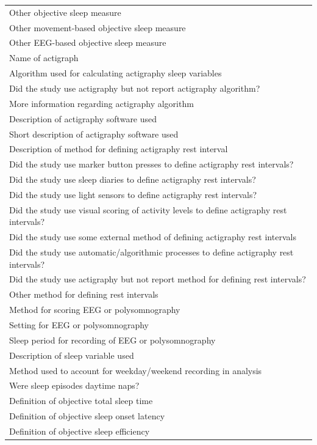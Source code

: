 \documentclass[
]{article}
\begin{document}
\begin{longtable}[t]{l}
Other objective sleep measure\\
Other movement-based objective sleep measure\\
Other EEG-based objective sleep measure\\
\addlinespace
Name of actigraph\\
Algorithm used for calculating actigraphy sleep variables\\
Did the study use actigraphy but not report actigraphy algorithm?\\
More information regarding actigraphy algorithm\\
Description of actigraphy software used\\
\addlinespace
Short description of actigraphy software used\\
Description of method for defining actigraphy rest interval\\
Did the study use marker button presses to define actigraphy rest intervals?\\
Did the study use sleep diaries to define actigraphy rest intervals?\\
Did the study use light sensors to define actigraphy rest intervals?\\
\addlinespace
Did the study use visual scoring of activity levels to define actigraphy rest intervals?\\
Did the study use some external method of defining actigraphy rest intervals\\
Did the study use automatic/algorithmic processes to define actigraphy rest intervals?\\
Did the study use actigraphy but not report method for defining rest intervals?\\
Other method for defining rest intervals\\
\addlinespace
Method for scoring EEG or polysomnography\\
Setting for EEG or polysomnography\\
Sleep period for recording of EEG or polysomnography\\
Description of sleep variable used\\
Method used to account for weekday/weekend recording in analysis\\
\addlinespace
Were sleep episodes daytime naps?\\
Definition of objective total sleep time\\
Definition of objective sleep onset latency\\
Definition of objective sleep efficiency\\

\end{longtable}
\end{document}
